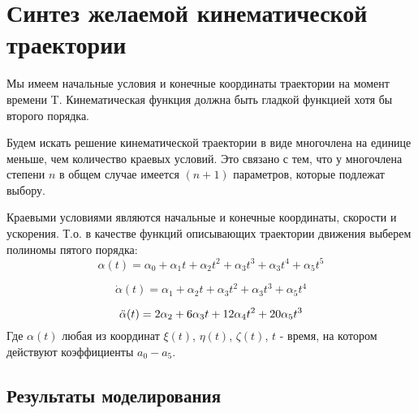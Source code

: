 \section{Синтез желаемой кинематической траектории}

Мы имеем начальные условия и конечные координаты траектории на момент времени T. Кинематическая функция должна быть гладкой функцией хотя бы второго порядка.

Будем искать решение кинематической траектории в виде многочлена на единице меньше, чем количество краевых условий. Это связано с тем, что у многочлена степени $n$ в общем случае имеется $(n + 1)$ параметров, которые подлежат выбору. 

Краевыми условиями являются начальные и конечные координаты, скорости и ускорения. Т.о. в качестве функций описывающих траектории движения выберем полиномы пятого порядка:
\begin{equation}
	\alpha(t) = \alpha_0 + \alpha_1 t + \alpha_2 t^2 + \alpha_3 t^3 + \alpha_3 t^4 + \alpha_5 t^5 
	\label{eq:ur_traectorii}
\end{equation}

\begin{equation}
	\Dot{\alpha}(t) = \alpha_1 + \alpha_2 t + \alpha_3 t^2 + \alpha_3 t^3 + \alpha_5 t^4 
	\label{eq:ur_velocity}
\end{equation}

\begin{equation}
	\Ddot{\alpha}(t) = 2 \alpha_2 + 6 \alpha_3 t + 12 \alpha_4 t^2 + 20 \alpha_5 t^3
\end{equation}
Где $\alpha(t)$ любая из координат $\xi(t)$, $\eta(t)$, $\zeta(t)$, $t$ - время, на котором действуют коэффициенты $a_0-a_5$.
\clearpage
\subsection{Результаты моделирования}
\clearpage